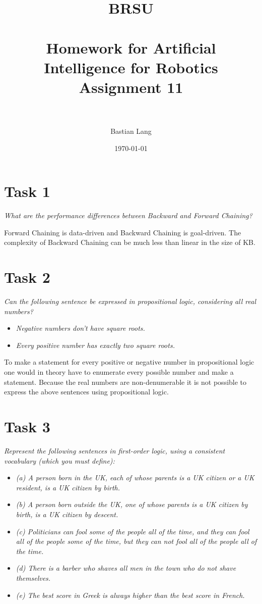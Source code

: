 \documentclass[paper=a4, fontsize=11pt]{scrartcl} %
\title{	
\normalfont \normalsize 
\textsc{BRSU} \\ [25pt] %
\horrule{0.5pt} \\[0.4cm] %
\huge Homework for Artificial Intelligence for Robotics\\Assignment 11 \\ %
\horrule{2pt} \\[0.5cm] %
}
\author{Bastian Lang} %
\date{\normalsize\today} %
\numberwithin{equation}{section} %
\numberwithin{figure}{section} %
\numberwithin{table}{section} %
\begin{document}
\maketitle %


\section{Task 1}
\textit{What are the performance differences between Backward and Forward Chaining?}

Forward Chaining is data-driven and Backward Chaining is goal-driven. The complexity of Backward Chaining can be much less than linear in the size of KB.

\section{Task 2}
\textit{Can the following sentence be expressed in propositional logic, considering all real numbers?}
\begin{itemize}
\item \textit{Negative numbers don't have square roots.}
\item \textit{Every positive number has exactly two square roots.}
\end{itemize}

To make a statement for every positive or negative number in propositional logic one would in theory have to enumerate every possible number and make a statement. Because the real numbers are non-denumerable it is not possible to express the above sentences using propositional logic.

\section{Task 3}
\textit{Represent the following sentences in first-order logic, using a consistent vocabulary (which
you must define):}
\begin{itemize}
\item \textit{(a) A person born in the UK, each of whose parents is a UK citizen or a UK resident, is
a UK citizen by birth.}
\item \textit{(b) A person born outside the UK, one of whose parents is a UK citizen by birth, is a
UK citizen by descent.}
\item \textit{(c) Politicians can fool some of the people all of the time, and they can fool all of the
people some of the time, but they can not fool all of the people all of the time.}
\item \textit{(d) There is a barber who shaves all men in the town who do not shave themselves.}
\item \textit{(e) The best score in Greek is always higher than the best score in French.}
\end{itemize}
\end{document}
